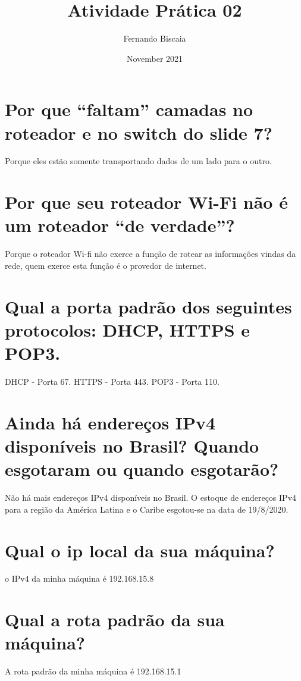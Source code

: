 \documentclass{article}
\title{Atividade Prática 02}
\author{Fernando Biscaia }
\date{November 2021}
\begin{document}
\maketitle

\section{Por que “faltam” camadas no roteador e no switch do slide 7?}

Porque eles estão somente transportando dados de um lado para o outro.

\section{Por que seu roteador Wi-Fi não é um roteador “de verdade”?}

Porque o roteador Wi-fi não exerce a função de rotear as informações vindas da rede, quem exerce esta função é o provedor de internet.

\section{Qual a porta padrão dos seguintes protocolos: DHCP, HTTPS e POP3.}

DHCP - Porta 67. HTTPS - Porta 443. POP3 - Porta 110.

\section{Ainda há endereços IPv4 disponíveis no Brasil? Quando esgotaram ou quando esgotarão?}

Não há mais endereços IPv4 disponíveis no Brasil. O estoque de endereços IPv4 para a região da América Latina e o Caribe esgotou-se na data de 19/8/2020.

\section{Qual o ip local da sua máquina?}

o IPv4 da minha máquina é 192.168.15.8

\section{Qual a rota padrão da sua máquina?}

A rota padrão da minha máquina é 192.168.15.1
\end{document}
